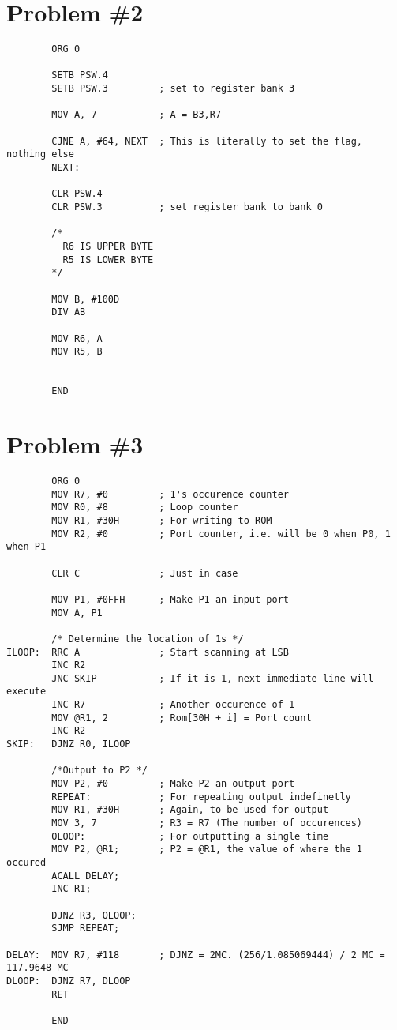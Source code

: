 \documentclass[12pt]{article}
\begin{document}
\section{Problem \#2}
\begin{verbatim}
        ORG 0

        SETB PSW.4
        SETB PSW.3         ; set to register bank 3

        MOV A, 7           ; A = B3,R7

        CJNE A, #64, NEXT  ; This is literally to set the flag, nothing else
        NEXT:

        CLR PSW.4
        CLR PSW.3          ; set register bank to bank 0

        /*
          R6 IS UPPER BYTE
          R5 IS LOWER BYTE
        */

        MOV B, #100D
        DIV AB

        MOV R6, A
        MOV R5, B


        END
\end{verbatim}

\section{Problem \#3}
\begin{verbatim}
        ORG 0
        MOV R7, #0         ; 1's occurence counter
        MOV R0, #8         ; Loop counter
        MOV R1, #30H       ; For writing to ROM
        MOV R2, #0         ; Port counter, i.e. will be 0 when P0, 1 when P1

        CLR C              ; Just in case

        MOV P1, #0FFH      ; Make P1 an input port
        MOV A, P1

        /* Determine the location of 1s */
ILOOP:  RRC A              ; Start scanning at LSB
        INC R2
        JNC SKIP           ; If it is 1, next immediate line will execute
        INC R7             ; Another occurence of 1
        MOV @R1, 2         ; Rom[30H + i] = Port count
        INC R2
SKIP:   DJNZ R0, ILOOP

        /*Output to P2 */
        MOV P2, #0         ; Make P2 an output port
        REPEAT:            ; For repeating output indefinetly
        MOV R1, #30H       ; Again, to be used for output
        MOV 3, 7           ; R3 = R7 (The number of occurences)
        OLOOP:             ; For outputting a single time
        MOV P2, @R1;       ; P2 = @R1, the value of where the 1 occured
        ACALL DELAY;
        INC R1;

        DJNZ R3, OLOOP;
        SJMP REPEAT;

DELAY:  MOV R7, #118       ; DJNZ = 2MC. (256/1.085069444) / 2 MC = 117.9648 MC
DLOOP:  DJNZ R7, DLOOP
        RET

        END

\end{verbatim}
\end{document}
